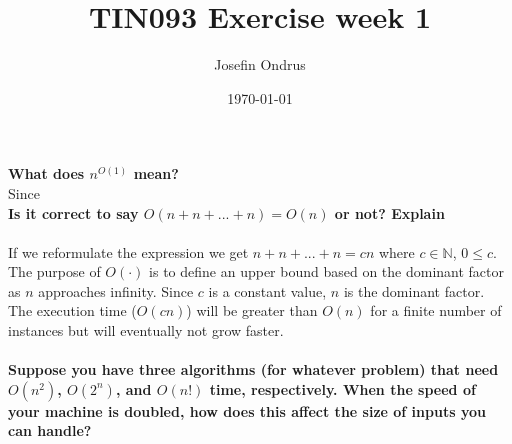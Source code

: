 \documentclass[12pt,oneside,reqno]{amsart}
\begin{document}
\setlength{\parindent}{0pt}
\def\code#1{\texttt{#1}} %

\title{TIN093 Exercise week 1}
\author{Josefin Ondrus}
\date{\today}
\maketitle

\textbf{What does $n^{O(1)}$ mean?}\\
Since\\

\textbf{Is it correct to say $O(n+n+...+n) = O(n)$ or not? Explain}\\\\%
If we reformulate the expression we get $n+n+...+n=cn$ where $c \in \mathbb{N}$, $0 \leq c$. The purpose of $O(\cdot)$ is to define an upper bound based on the dominant factor as $n$ approaches infinity. Since $c$ is a constant value, $n$ is the dominant factor. The execution time ($O(cn)$) will be greater than $O(n)$ for a finite number of instances but will eventually not grow faster. \\\\
\textbf{Suppose you have three algorithms (for whatever problem) that need $O(n^2)$, $O(2^n)$, and $O(n!)$ time, respectively. When the speed of your machine is doubled, how does this affect the size of inputs you can handle?}
\\
\end{document}
